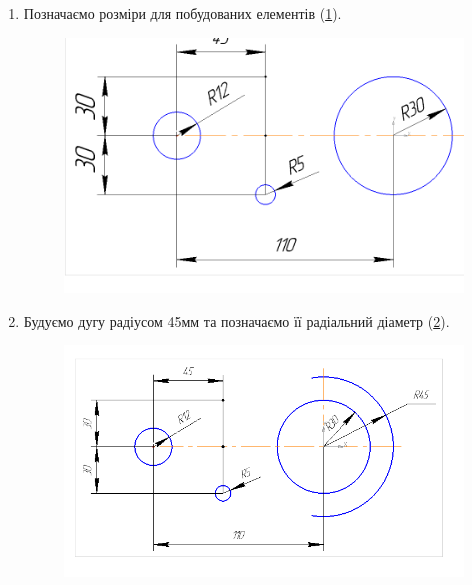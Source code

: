 \begin{enumerate}[leftmargin=*]
\item Позначаємо розміри для побудованих елементів (\ref{fig:lab4:step4}).
  \begin{figure}[!ht]
    \centering \includegraphics[width=0.9\linewidth]{./images/lab4/step4.png}
    \caption{\label{fig:lab4:step4}}
  \end{figure}
  \FloatBarrier

\item Будуємо дугу радіусом 45мм та позначаємо її радіальний діаметр (\ref{fig:lab4:step5}).
  \begin{figure}[!ht]
    \centering \includegraphics[width=0.9\linewidth]{./images/lab4/step5.png}
    \caption{\label{fig:lab4:step5}}
  \end{figure}
  \FloatBarrier
  

\end{enumerate}
